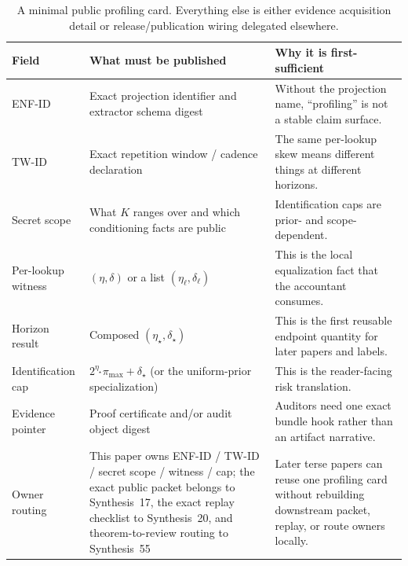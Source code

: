 \documentclass[11pt]{article}
\begin{document}
\begin{table}[t]
\centering
\small
\begin{tabularx}{\linewidth}{@{}l X X@{}}
\toprule
Field & What must be published & Why it is first-sufficient \\
\midrule
ENF-ID & Exact projection identifier and extractor schema digest & Without the projection name, ``profiling'' is not a stable claim surface. \\
TW-ID & Exact repetition window / cadence declaration & The same per-lookup skew means different things at different horizons. \\
Secret scope & What $K$ ranges over and which conditioning facts are public & Identification caps are prior- and scope-dependent. \\
Per-lookup witness & $(\eta,\delta)$ or a list $(\eta_\ell,\delta_\ell)$ & This is the local equalization fact that the accountant consumes. \\
Horizon result & Composed $(\eta_\star,\delta_\star)$ & This is the first reusable endpoint quantity for later papers and labels. \\
Identification cap & $2^{\eta_\star}\pi_{\max}+\delta_\star$ (or the uniform-prior specialization) & This is the reader-facing risk translation. \\
Evidence pointer & Proof certificate and/or audit object digest & Auditors need one exact bundle hook rather than an artifact narrative. \\
Owner routing & This paper owns ENF-ID / TW-ID / secret scope / witness / cap; the exact public packet belongs to Synthesis~17, the exact replay checklist to Synthesis~20, and theorem-to-review routing to Synthesis~55 & Later terse papers can reuse one profiling card without rebuilding downstream packet, replay, or route owners locally. \\
\bottomrule
\end{tabularx}
\caption{A minimal public profiling card. Everything else is either evidence acquisition detail or release/publication wiring delegated elsewhere.}
\label{tab:profiling-card}
\end{table}
\end{document}

